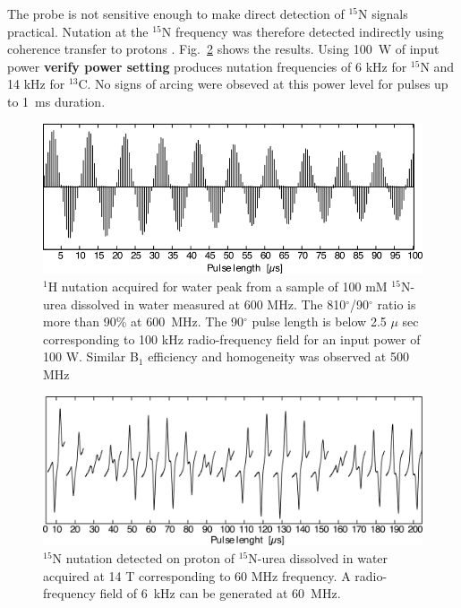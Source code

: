 \documentclass[preprint,12pt]{article}
\newcommand{\todo}[1]{{\color{red}\textbf{#1}}}
\newcommand{\fig}[1]{Fig.~\ref{#1}}
\begin{document}
The probe is not sensitive enough to make direct detection of $^{15}$N signals practical. Nutation at the
$^{15}$N frequency was therefore detected indirectly using coherence transfer to protons \cite{bax_indirect}. 
\fig{fig:15N-nutation} shows the results. Using 100~W of input power \todo{verify power setting} 
produces nutation frequencies of 6 kHz for $^{15}$N and 14 kHz for $^{13}$C. 
No signs of arcing were obseved at this power level for pulses up to 1~ms duration.

\begin{figure}
\centering
\includegraphics[width=.7\linewidth,keepaspectratio=true]{./figures/ms5n17-tlp-sp-150218-1-Hnutation-171216-103.png} 
\caption{$^1$H nutation acquired for water peak from a sample of 100 mM $^{15}$N-urea dissolved in water measured at 600 MHz. The 810$^{\circ}$/90$^{\circ}$ ratio is more than 90\% at 600~MHz. The 90$^{\circ}$ pulse length is below 2.5 $\mu$ sec corresponding to 100 kHz radio-frequency field for an input power of 100 W. Similar B$_{1}$ efficiency and homogeneity was observed at 500 MHz}
\label{fig:1H-nutation} 
\end{figure}

\begin{figure}
\centering
\includegraphics[width=.7\linewidth,keepaspectratio=true]{./figures/ms5n17-tlp-sp-150218-15-Nnutation-171215-003.png} 
\caption{$^{15}$N nutation detected on proton of $^{15}$N-urea dissolved in water acquired at 14 T corresponding to 60 MHz frequency. A radio-frequency field of 6~kHz can be generated at 60~MHz.}
\label{fig:15N-nutation} 
\end{figure}
\end{document}

